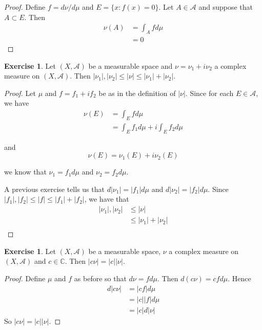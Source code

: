 \documentclass[12pt]{amsart}
\theoremstyle{definition}
\newtheorem{ex}[definition]{Exercise}
\newcommand{\C}{\mathbb{C}}
\newcommand{\MA}{\mathcal{A}}
\newcommand{\lex}[1]{\label{ex:#1}}
\begin{document}
	\begin{proof}
		Define $f = d\nu / d \mu$ and $E = \{x: f(x) = 0\}$. Let $A \in \MA$ and suppose that $A \subset E$. Then 
		\begin{align*}
			\nu(A) 
			&= \int_A f d\mu\\
			&= 0
		\end{align*} 
	\end{proof}
	
	\begin{ex} \lex{00000} 
		Let $(X, \MA)$ be a measurable space and $\nu = \nu_1 + i\nu_2$ a complex measure on $(X, \MA)$. Then $|\nu_1|, |\nu_2| \leq |\nu| \leq |\nu_1| + |\nu_2|$.
		
	\end{ex}
	
	\begin{proof}
		Let $\mu$ and $f = f_1 + i f_2$ be as in the definition of $|\nu|$. Since for each $E \in \MA$, we have 
		\begin{align*}
			\nu(E) 
			&= \int_E f d\mu\\
			&= \int_E f_1 d \mu + i \int_E f_2 d\mu
		\end{align*}
		
		and $$\nu(E) = \nu_1(E) + i\nu_2(E)$$
		
		we know that $\nu_1 = f_1 d\mu$ and $\nu_2 = f_2 d \mu$. 
		
		A previous exercise tells us that $d|\nu_1| = |f_1|d\mu$ and $d |\nu_2| = |f_2|d \mu$. Since $|f_1|, |f_2| \leq |f| \leq |f_1|+|f_2|$, we have that 
		\begin{align*}
			|\nu_1|, |\nu_2| 
			&\leq |\nu| \\
			&\leq |\nu_1| + |\nu_2|\\
		\end{align*}
	\end{proof}
	
	\begin{ex} \lex{00000} 
		Let  $(X, \MA)$ be a measurable space, $\nu$ a complex measure on $(X, \MA)$ and $c \in \C$. Then $\vert c \nu \vert = \vert c \vert \vert \nu \vert$.
	\end{ex}
	
	\begin{proof}
		Define $\mu$ and $f$ as before so that $d \nu = f d \mu$. Then $d (c \nu) = c f d \mu$. Hence 
		\begin{align*}
			d \vert c \nu \vert 
			&= \vert cf \vert d \mu \\
			&= \vert c \vert \vert f \vert d \mu\\
			&= \vert c \vert d\vert \nu \vert
		\end{align*}
		So $\vert c \nu \vert = \vert c \vert \vert  \nu \vert$.
	\end{proof}
\end{document}
